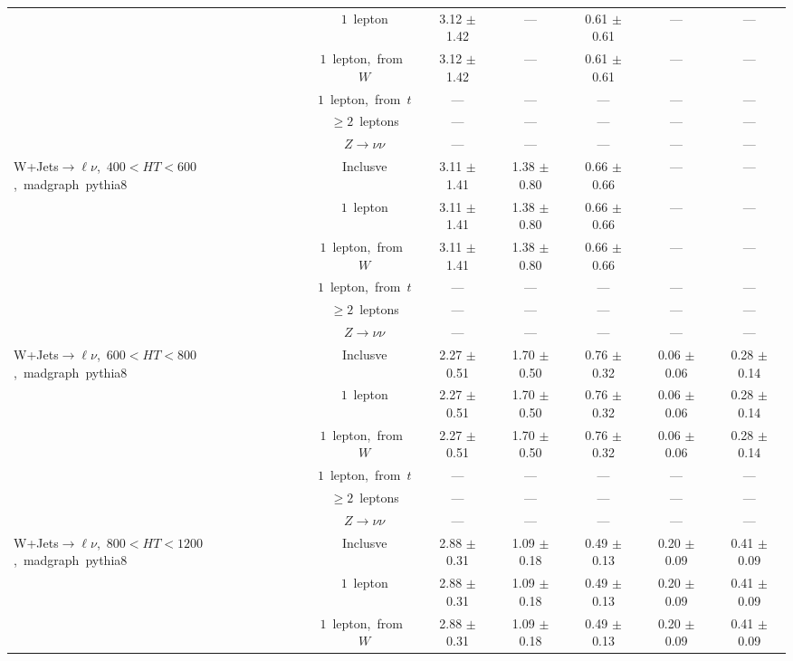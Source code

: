 \documentclass{article}
\begin{document}
\begin{longtable}{|l|c|c|c|c|c|c|}
 & $1$~lepton  & 3.12 $\pm$ 1.42  & ---  & 0.61 $\pm$ 0.61  & ---  & --- \\* 
 & $1$~lepton,~from~$W$  & 3.12 $\pm$ 1.42  & ---  & 0.61 $\pm$ 0.61  & ---  & --- \\* 
 & $1$~lepton,~from~$t$  & ---  & ---  & ---  & ---  & --- \\* 
 & $\ge2$~leptons  & ---  & ---  & ---  & ---  & --- \\* 
 & $Z\rightarrow\nu\nu$  & ---  & ---  & ---  & ---  & --- \\* 
\hline 
\multirow{6}{*}{W+Jets$\rightarrow\ell\nu$,~$400<HT<600$,~madgraph~pythia8} & Inclusve  & 3.11 $\pm$ 1.41  & 1.38 $\pm$ 0.80  & 0.66 $\pm$ 0.66  & ---  & --- \\* 
 & $1$~lepton  & 3.11 $\pm$ 1.41  & 1.38 $\pm$ 0.80  & 0.66 $\pm$ 0.66  & ---  & --- \\* 
 & $1$~lepton,~from~$W$  & 3.11 $\pm$ 1.41  & 1.38 $\pm$ 0.80  & 0.66 $\pm$ 0.66  & ---  & --- \\* 
 & $1$~lepton,~from~$t$  & ---  & ---  & ---  & ---  & --- \\* 
 & $\ge2$~leptons  & ---  & ---  & ---  & ---  & --- \\* 
 & $Z\rightarrow\nu\nu$  & ---  & ---  & ---  & ---  & --- \\* 
\hline 
\multirow{6}{*}{W+Jets$\rightarrow\ell\nu$,~$600<HT<800$,~madgraph~pythia8} & Inclusve  & 2.27 $\pm$ 0.51  & 1.70 $\pm$ 0.50  & 0.76 $\pm$ 0.32  & 0.06 $\pm$ 0.06  & 0.28 $\pm$ 0.14 \\* 
 & $1$~lepton  & 2.27 $\pm$ 0.51  & 1.70 $\pm$ 0.50  & 0.76 $\pm$ 0.32  & 0.06 $\pm$ 0.06  & 0.28 $\pm$ 0.14 \\* 
 & $1$~lepton,~from~$W$  & 2.27 $\pm$ 0.51  & 1.70 $\pm$ 0.50  & 0.76 $\pm$ 0.32  & 0.06 $\pm$ 0.06  & 0.28 $\pm$ 0.14 \\* 
 & $1$~lepton,~from~$t$  & ---  & ---  & ---  & ---  & --- \\* 
 & $\ge2$~leptons  & ---  & ---  & ---  & ---  & --- \\* 
 & $Z\rightarrow\nu\nu$  & ---  & ---  & ---  & ---  & --- \\* 
\hline 
\multirow{6}{*}{W+Jets$\rightarrow\ell\nu$,~$800<HT<1200$,~madgraph~pythia8} & Inclusve  & 2.88 $\pm$ 0.31  & 1.09 $\pm$ 0.18  & 0.49 $\pm$ 0.13  & 0.20 $\pm$ 0.09  & 0.41 $\pm$ 0.09 \\* 
 & $1$~lepton  & 2.88 $\pm$ 0.31  & 1.09 $\pm$ 0.18  & 0.49 $\pm$ 0.13  & 0.20 $\pm$ 0.09  & 0.41 $\pm$ 0.09 \\* 
 & $1$~lepton,~from~$W$  & 2.88 $\pm$ 0.31  & 1.09 $\pm$ 0.18  & 0.49 $\pm$ 0.13  & 0.20 $\pm$ 0.09  & 0.41 $\pm$ 0.09 \\* 

\end{longtable}
\end{document}
